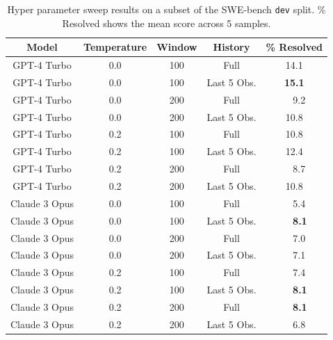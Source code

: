 \begin{table}[ht]
    \caption{
    Hyper parameter sweep results on a subset of the SWE-bench \texttt{dev} split.
    \% Resolved shows the mean score across 5 samples.
    }
    \label{tab:appx:hyperparam_sweep}
    \vspace{0.25em}
    \centering
    \begin{tabular}{ccccc}
        \toprule
        Model & Temperature & Window & History & \% Resolved \\
        \midrule
        GPT-4 Turbo & 0.0 & 100 & Full          &       14.1  \\
        GPT-4 Turbo & 0.0 & 100 & Last 5 Obs.   &  {\bf 15.1} \\
        GPT-4 Turbo & 0.0 & 200 & Full          &       ~~9.2  \\
        GPT-4 Turbo & 0.0 & 200 & Last 5 Obs.   &       10.8  \\
        GPT-4 Turbo & 0.2 & 100 & Full          &       10.8  \\
        GPT-4 Turbo & 0.2 & 100 & Last 5 Obs.   &       12.4  \\
        GPT-4 Turbo & 0.2 & 200 & Full          &       ~~8.7  \\
        GPT-4 Turbo & 0.2 & 200 & Last 5 Obs.   &       10.8  \\
        \midrule
        Claude 3 Opus & 0.0 & 100 & Full        &       ~~5.4   \\
        Claude 3 Opus & 0.0 & 100 & Last 5 Obs. &  {\bf ~~8.1} \\
        Claude 3 Opus & 0.0 & 200 & Full        &       ~~7.0   \\
        Claude 3 Opus & 0.0 & 200 & Last 5 Obs. &       ~~7.1   \\
        Claude 3 Opus & 0.2 & 100 & Full        &       ~~7.4   \\
        Claude 3 Opus & 0.2 & 100 & Last 5 Obs. &  {\bf ~~8.1} \\
        Claude 3 Opus & 0.2 & 200 & Full        &  {\bf ~~8.1} \\
        Claude 3 Opus & 0.2 & 200 & Last 5 Obs. &       ~~6.8   \\
        \bottomrule
    \end{tabular}
\end{table}
